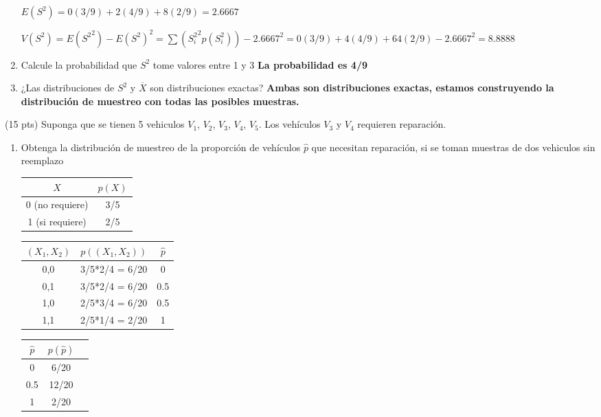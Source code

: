 \documentclass[addpoints]{exam}
\theoremstyle{mytheor}
\begin{document}
\begin{questions}
\begin{enumerate}
  $E(S^2) = 0(3/9)+2(4/9)+8(2/9) = 2.6667$ 
  
  $V(S^2) = E({S^2}^2) - E(S^2)^2 = \sum({S_i^2}^2 p(S_i^2)) - 2.6667^2 = 0(3/9)+4(4/9)+64(2/9)- 2.6667^2 = 8.8888$
  
  \item Calcule la probabilidad que $S^2$ tome valores entre 1 y 3
  \textbf{La probabilidad es 4/9}
  
  \item ¿Las distribuciones de $S^2$ y $\overline{X}$ son distribuciones exactas?
  \textbf{Ambas son distribuciones exactas, estamos construyendo la distribución de muestreo con todas las posibles muestras.}
  
  \end{enumerate}
  
  \question (15 pts) Suponga que se tienen 5 vehiculos $V_1$, $V_2$, $V_3$, $V_4$, $V_5$. Los vehículos $V_3$ y $V_4$ requieren reparación.
  \begin{enumerate}
  \item Obtenga la distribución de muestreo de la proporción de vehículos $\hat{p}$ que necesitan reparación, si se toman muestras de dos vehiculos sin reemplazo
  
  \begin{center}
  \begin{tabular}{ |c|c|} 
  \hline
  $X$ & $p(X)$ \\ 
   \hline
   0 (no requiere) & 3/5  \\ 
   1 (si requiere) & 2/5  \\ 
   \hline
  \end{tabular}
  \end{center}
  
  \begin{center}
  \begin{tabular}{ |c|c|c| } 
  \hline
  $(X_1, X_2)$ & $p((X_1, X_2))$ & $\hat{p}$ \\ 
   \hline
   0,0 &  3/5*2/4 = 6/20 & 0 \\ 
   0,1 &  3/5*2/4 = 6/20 & 0.5 \\ 
   1,0 &  2/5*3/4 = 6/20 & 0.5 \\ 
   1,1 &  2/5*1/4 = 2/20 & 1 \\ 
   \hline
  \end{tabular}
  \end{center}
  
  \begin{center}
  \begin{tabular}{ |c|c|c| } 
  \hline
  $\hat{p}$ & $p(\hat{p})$ \\ 
   \hline
   0 &  6/20  \\ 
   0.5 &  12/20  \\ 
   1 &  2/20  \\ 
   \hline
  \end{tabular}
  \end{center}
  


\end{enumerate}
\end{questions}
\end{document}
